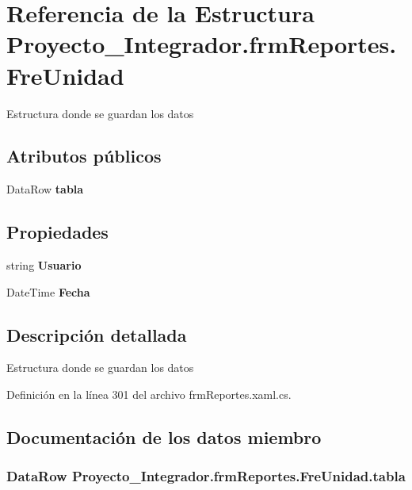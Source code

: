 \section{Referencia de la Estructura Proyecto\-\_\-\-Integrador.\-frm\-Reportes.\-Fre\-Unidad}
\label{struct_proyecto___integrador_1_1frm_reportes_1_1_fre_unidad}


Estructura donde se guardan los datos  


\subsection*{Atributos públicos}
\begin{DoxyCompactItemize}
\item 
Data\-Row {\bf tabla}
\end{DoxyCompactItemize}
\subsection*{Propiedades}
\begin{DoxyCompactItemize}
\item 
string {\bf Usuario}\hspace{0.3cm}{\ttfamily  [get]}
\item 
Date\-Time {\bf Fecha}\hspace{0.3cm}{\ttfamily  [get]}
\end{DoxyCompactItemize}


\subsection{Descripción detallada}
Estructura donde se guardan los datos 



Definición en la línea 301 del archivo frm\-Reportes.\-xaml.\-cs.



\subsection{Documentación de los datos miembro}
\subsubsection[{tabla}]{\setlength{\rightskip}{0pt plus 5cm}Data\-Row Proyecto\-\_\-\-Integrador.\-frm\-Reportes.\-Fre\-Unidad.\-tabla}\label{struct_proyecto___integrador_1_1frm_reportes_1_1_fre_unidad_ade949aaec689c4c3221d3e65043fc69a}


